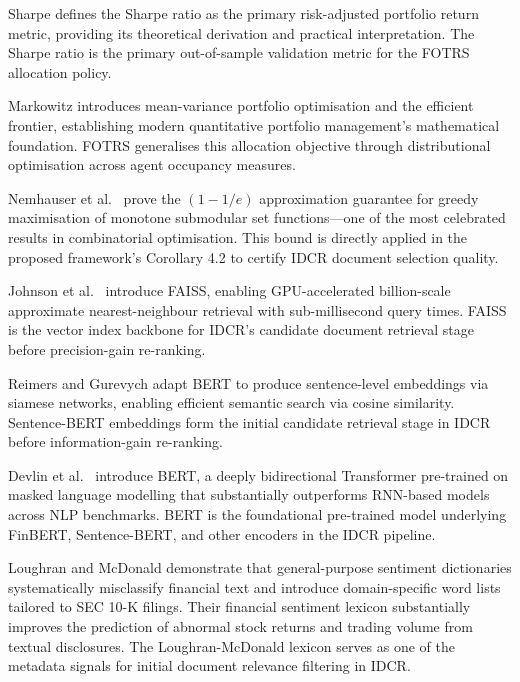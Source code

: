 \documentclass[12pt,a4paper,oneside]{report}
\theoremstyle{definition}
\theoremstyle{remark}
\begin{document}
\medskip

\noindent Sharpe \cite{Sharpe1994Ratio} defines the Sharpe ratio as the primary risk-adjusted portfolio return metric, providing its theoretical derivation and practical interpretation. The Sharpe ratio is the primary out-of-sample validation metric for the FOTRS allocation policy.

\medskip

\noindent Markowitz \cite{Markowitz1952Portfolio} introduces mean-variance portfolio optimisation and the efficient frontier, establishing modern quantitative portfolio management's mathematical foundation. FOTRS generalises this allocation objective through distributional optimisation across agent occupancy measures.

\medskip

\noindent Nemhauser et al.\ \cite{Nemhauser1978Submodular} prove the $(1-1/e)$ approximation guarantee for greedy maximisation of monotone submodular set functions---one of the most celebrated results in combinatorial optimisation. This bound is directly applied in the proposed framework's Corollary 4.2 to certify IDCR document selection quality.

\medskip

\noindent Johnson et al.\ \cite{Johnson2019FAISS} introduce FAISS, enabling GPU-accelerated billion-scale approximate nearest-neighbour retrieval with sub-millisecond query times. FAISS is the vector index backbone for IDCR's candidate document retrieval stage before precision-gain re-ranking.

\medskip

\noindent Reimers and Gurevych \cite{Reimers2019SBERT} adapt BERT to produce sentence-level embeddings via siamese networks, enabling efficient semantic search via cosine similarity. Sentence-BERT embeddings form the initial candidate retrieval stage in IDCR before information-gain re-ranking.

\medskip

\noindent Devlin et al.\ \cite{Devlin2019BERT} introduce BERT, a deeply bidirectional Transformer pre-trained on masked language modelling that substantially outperforms RNN-based models across NLP benchmarks. BERT is the foundational pre-trained model underlying FinBERT, Sentence-BERT, and other encoders in the IDCR pipeline.

\noindent Loughran and McDonald \cite{Loughran2011SentimentFinance} demonstrate that general-purpose sentiment dictionaries systematically misclassify financial text and introduce domain-specific word lists tailored to SEC 10-K filings. Their financial sentiment lexicon substantially improves the prediction of abnormal stock returns and trading volume from textual disclosures. The Loughran-McDonald lexicon serves as one of the metadata signals for initial document relevance filtering in IDCR.
\end{document}
